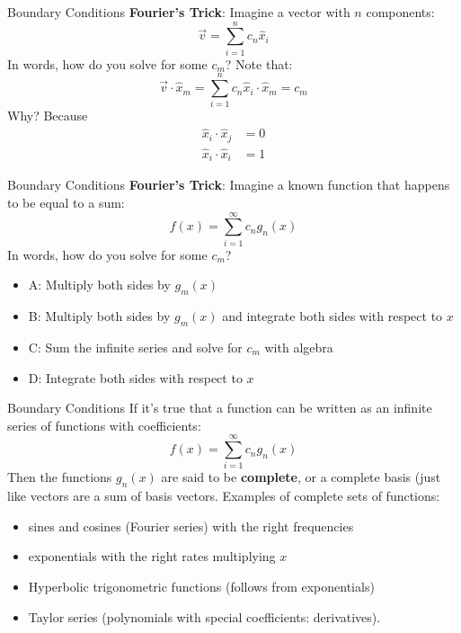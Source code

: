 \documentclass{beamer}
\begin{document}
\begin{frame}{Boundary Conditions}
\alert{\textbf{Fourier's Trick}}: Imagine a vector with $n$ components:
\begin{equation}
\vec{v} = \sum_{i = 1}^n c_n \hat{x}_i
\end{equation}
In words, how do you solve for some $c_m$? Note that:
\begin{equation}
\vec{v} \cdot \hat{x}_m = \sum_{i = 1}^n c_n \hat{x}_i \cdot \hat{x}_m = c_m
\end{equation}
Why?  Because
\begin{align}
\hat{x}_i \cdot \hat{x}_j &= 0 \\
\hat{x}_i \cdot \hat{x}_i &= 1
\end{align}
\end{frame}

\begin{frame}{Boundary Conditions}
\alert{\textbf{Fourier's Trick}}: Imagine a known function that happens to be equal to a sum:
\begin{equation}
f(x) = \sum_{i = 1}^{\infty} c_n g_n(x)
\end{equation}
In words, how do you solve for some $c_m$?
\begin{itemize}
\item A: Multiply both sides by $g_m(x)$
\item B: Multiply both sides by $g_m(x)$ and integrate both sides with respect to $x$
\item C: Sum the infinite series and solve for $c_m$ with algebra
\item D: Integrate both sides with respect to $x$
\end{itemize}
\end{frame}

\begin{frame}{Boundary Conditions}
If it's true that a function can be written as an infinite series of functions with coefficients:
\begin{equation}
f(x) = \sum_{i = 1}^{\infty} c_n g_n(x)
\end{equation}
Then the functions $g_n(x)$ are said to be \textbf{\alert{complete}}, or a complete basis (just like vectors are a sum of basis vectors. Examples of complete sets of functions:
\begin{itemize}
\item sines and cosines (Fourier series) with the right frequencies
\item exponentials with the right rates multiplying $x$
\item Hyperbolic trigonometric functions (follows from exponentials)
\item Taylor series (polynomials with special coefficients: derivatives).
\end{itemize}
\end{frame}
\end{document}
